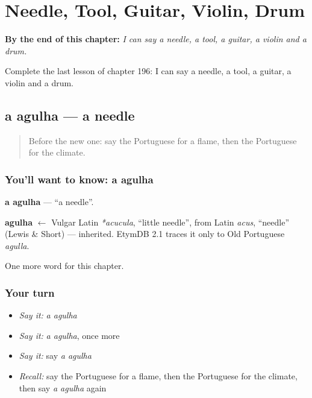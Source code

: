 
\chapter{Needle, Tool, Guitar, Violin, Drum}
\label{ch:pt-needle-tool-guitar-violin-drum}

\begin{chapteropening}
\textbf{By the end of this chapter:} \emph{I can say a needle, a tool, a guitar, a violin and a drum.}

Complete the last lesson of chapter 196: I can say a needle, a tool, a guitar, a violin and a drum.
\end{chapteropening}

\section[a agulha]{a agulha — a needle}

\label{lesson:PT-C196-agulha}



\begin{quote}
Before the new one: say the Portuguese for a flame, then the Portuguese for the climate.
\end{quote}

\subsection*{You'll want to know: a agulha}
\textbf{a agulha} — \textquotedblleft{}a needle\textquotedblright{}.

\begin{cousinweb}
\textbf{agulha} $\leftarrow$ Vulgar Latin \emph{*acucula}, \textquotedblleft{}little needle\textquotedblright{}, from Latin \emph{acus}, \textquotedblleft{}needle\textquotedblright{} (Lewis \& Short) — inherited. EtymDB 2.1 traces it only to Old Portuguese \emph{agulla}.
\end{cousinweb}

\begin{grammarlens}[title={What you've built}]
One more word for this chapter.
\end{grammarlens}

\subsection*{Your turn}
\begin{itemize}
\raggedright
  \item \emph{Say it:} \emph{a agulha}
  \item \emph{Say it:} \emph{a agulha}, once more
  \item \emph{Say it:} say \emph{a agulha}
  \item \emph{Recall:} say the Portuguese for a flame, then the Portuguese for the climate, then say \emph{a agulha} again
\end{itemize}

